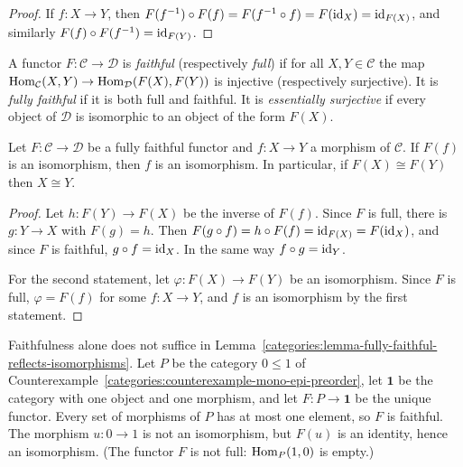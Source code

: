 \begin{proof}
If $f \colon X \to Y$, then
$F(f^{-1}) \circ F(f) = F(f^{-1} \circ f) = F(\mathrm{id}_X) = \mathrm{id}_{F(X)}$, and
similarly $F(f) \circ F(f^{-1}) = \mathrm{id}_{F(Y)}$.
\end{proof}

\begin{definition}\label{categories:definition-full-faithful}
A functor $F \colon \mathcal{C} \to \mathcal{D}$ is \emph{faithful}
(respectively \emph{full}) if for all $X, Y \in \mathcal{C}$ the map
$\operatorname{Hom}_{\mathcal{C}}(X, Y) \to \operatorname{Hom}_{\mathcal{D}}(F(X), F(Y))$ is injective
(respectively surjective). It is \emph{fully faithful} if it is both full and
faithful. It is \emph{essentially surjective} if every object of $\mathcal{D}$
is isomorphic to an object of the form $F(X)$.
\end{definition}

\begin{lemma}\label{categories:lemma-fully-faithful-reflects-isomorphisms}
Let $F \colon \mathcal{C} \to \mathcal{D}$ be a fully faithful functor and
$f \colon X \to Y$ a morphism of $\mathcal{C}$. If $F(f)$ is an isomorphism,
then $f$ is an isomorphism. In particular, if $F(X) \cong F(Y)$ then
$X \cong Y$.
\end{lemma}

\begin{proof}
Let $h \colon F(Y) \to F(X)$ be the inverse of $F(f)$. Since $F$ is full,
there is $g \colon Y \to X$ with $F(g) = h$. Then
$F(g \circ f) = h \circ F(f) = \mathrm{id}_{F(X)} = F(\mathrm{id}_X)$, and since $F$ is
faithful, $g \circ f = \mathrm{id}_X$. In the same way $f \circ g = \mathrm{id}_Y$.

For the second statement, let $\varphi \colon F(X) \to F(Y)$ be an
isomorphism. Since $F$ is full, $\varphi = F(f)$ for some $f \colon X \to Y$,
and $f$ is an isomorphism by the first statement.
\end{proof}

\begin{counterexample}\label{categories:counterexample-faithful-not-reflecting}
Faithfulness alone does not suffice in
Lemma~\ref{categories:lemma-fully-faithful-reflects-isomorphisms}. Let $P$ be
the category $0 \leq 1$ of
Counterexample~\ref{categories:counterexample-mono-epi-preorder}, let
$\mathbf{1}$ be the category with one object and one morphism, and let
$F \colon P \to \mathbf{1}$ be the unique functor. Every set of morphisms of
$P$ has at most one element, so $F$ is faithful. The morphism
$u \colon 0 \to 1$ is not an isomorphism, but $F(u)$ is an identity, hence an
isomorphism. (The functor $F$ is not full: $\operatorname{Hom}_P(1, 0)$ is empty.)
\end{counterexample}

